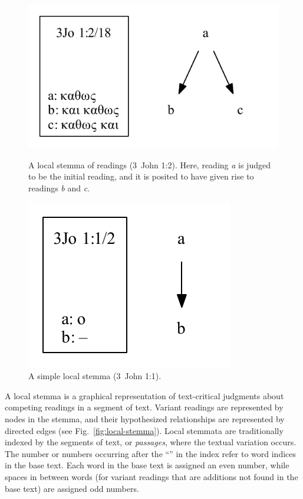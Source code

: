 \documentclass[a4paper, 12pt]{article}
\begin{document}
	\begin{figure}
		\vspace{-\baselineskip}
		\centering
		\includegraphics[scale=0.6666]{../graphics/B25K1V2U18-local-stemma.pdf}
		\caption{A local stemma of readings (3~John 1:2). Here, reading \emph{a} is judged to be the initial reading, and it is posited to have given rise to readings \emph{b} and \emph{c}.}
		\label{fig:local-stemma}
		\vspace{\baselineskip}
		\includegraphics[scale=0.6666]{../graphics/B25K1V1U2-local-stemma.pdf}
		\caption{A simple local stemma (3~John 1:1).}
		\label{fig:local-stemma-simple}
	\end{figure}
	\noindent
	A local stemma is a graphical representation of text-critical judgments about competing readings in a segment of text. Variant readings are represented by nodes in the stemma, and their hypothesized relationships are represented by directed edges (see Fig.~\ref{fig:local-stemma}). Local stemmata are traditionally indexed by the segments of text, or \emph{passages}, where the textual variation occurs. The number or numbers occurring after the ``\ForwardSlash '' in the index refer to word indices in the base text. Each word in the base text is assigned an even number, while spaces in between words (for variant readings that are additions not found in the base text) are assigned odd numbers. 
	
\end{document}
